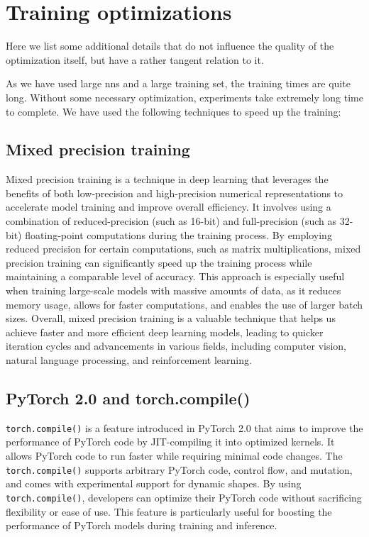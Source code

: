 \section{Training optimizations}

Here we list some additional details that do not influence the quality of the optimization itself, but have a rather
tangent relation to it.

As we have used large \glspl{nn} and a large training set, the training times are quite long. Without some necessary
optimization, experiments take extremely long time to complete. We have used the following techniques to speed up the
training:

\subsection{Mixed precision training}

Mixed precision training is a technique in deep learning that leverages the benefits of both low-precision and
high-precision numerical representations to accelerate model training and improve overall efficiency. It involves using
a combination of reduced-precision (such as 16-bit) and full-precision (such as 32-bit) floating-point computations
during the training process. By employing reduced precision for certain computations, such as matrix multiplications,
mixed precision training can significantly speed up the training process while maintaining a comparable level of
accuracy. This approach is especially useful when training large-scale models with massive amounts of data, as it
reduces memory usage, allows for faster computations, and enables the use of larger batch sizes. Overall, mixed
precision training is a valuable technique that helps us achieve faster and more efficient deep learning models, leading
to quicker iteration cycles and advancements in various fields, including computer vision, natural language processing,
and reinforcement learning.


\subsection{PyTorch 2.0 and torch.compile()}

\verb|torch.compile()| is a feature introduced in PyTorch 2.0 \cite{pytorch} that aims to improve the performance of
PyTorch code by JIT-compiling it into optimized kernels. It allows PyTorch code to run faster while requiring minimal
code changes. The \verb|torch.compile()| supports arbitrary PyTorch code, control flow, and mutation, and comes with
experimental support for dynamic shapes. By using \verb|torch.compile()|, developers can optimize their PyTorch code
without sacrificing flexibility or ease of use.  This feature is particularly useful for boosting the performance of
PyTorch models during training and inference.

